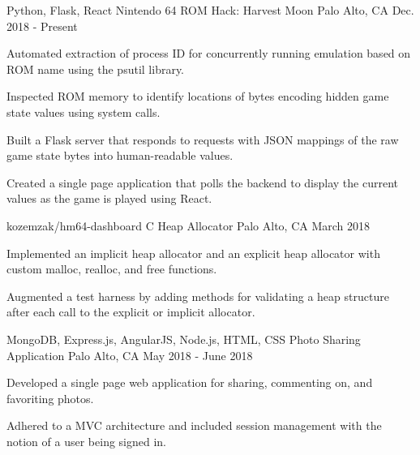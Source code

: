 
\begin{cventries}
  \cvprojectentry
    {Python, Flask, React}
    {Nintendo 64 ROM Hack: Harvest Moon}
    {Palo Alto, CA}
    {Dec. 2018 - Present}
    {
      \begin{cvitems}
        \item{Automated extraction of process ID for concurrently running emulation based on ROM name using the psutil library.}
        \item{Inspected ROM memory to identify locations of bytes encoding hidden game state values using system calls.}
        \item{Built a Flask server that responds to requests with JSON mappings of the raw game state bytes into human-readable values.}
        \item{Created a single page application that polls the backend to display the current values as the game is played using React.}
      \end{cvitems} 
    }
    {kozemzak/hm64-dashboard}
  \cvprojectentry
    {C}
    {Heap Allocator}
    {Palo Alto, CA}
    {March 2018}
    {
      \begin{cvitems}
        \item {Implemented an implicit heap allocator and an explicit heap allocator with custom malloc, realloc, and free functions.}
        \item {Augmented a test harness by adding methods for validating a heap structure after each call to the explicit or implicit allocator.}
      \end{cvitems}
    }
    {}
  \cvprojectentry
    {MongoDB, Express.js, AngularJS, Node.js, HTML, CSS}
    {Photo Sharing Application}
    {Palo Alto, CA}
    {May 2018 - June 2018}
    {
      \begin{cvitems}
        \item {Developed a single page web application for sharing, commenting on, and favoriting photos.}
        \item {Adhered to a MVC architecture and included session management with the notion of a user being signed in.}
      \end{cvitems} 
    }
    {}
\end{cventries}